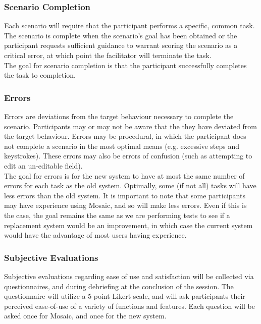 \documentclass[10pt]{article}
\begin{document}
\begin{multicols}{2}
\subsubsection*{Scenario Completion}
Each scenario will require that the participant performs a specific, common task. The scenario is complete when the scenario's goal has been obtained or the participant requests sufficient guidance to warrant scoring the scenario as a critical error, at which point the facilitator will terminate the task.\\

The goal for scenario completion is that the participant successfully completes the task to completion.

\subsubsection*{Errors}
Errors are deviations from the target behaviour necessary to complete the scenario. Participants may or may not be aware that the they have deviated from the target behaviour. Errors may be procedural, in which the participant does not complete a scenario in the most optimal means (e.g. excessive steps and keystrokes). These errors may also be errors of confusion (such as attempting to edit an un-editable field).\\

The goal for errors is for the new system to have at most the same number of errors for each task as the old system. Optimally, some (if not all) tasks will have less errors than the old system. It is important to note that some participants may have experience using Mosaic, and so will make less errors. Even if this is the case, the goal remains the same as we are performing tests to see if a replacement system would be an improvement, in which case the current system would have the advantage of most users having experience.

\subsubsection*{Subjective Evaluations}
Subjective evaluations regarding ease of use and satisfaction will be collected via questionnaires, and during debriefing at the conclusion of the session. The questionnaire will utilize a 5-point Likert scale, and will ask participants their perceived ease-of-use of a variety of functions and features. Each question will be asked once for Mosaic, and once for the new system.\\


\end{multicols}
\end{document}
